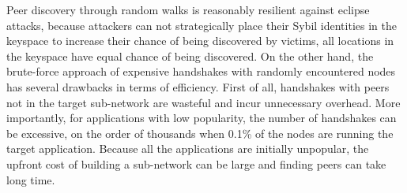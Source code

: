 Peer discovery through random walks is reasonably resilient against eclipse attacks, because attackers can not strategically place their Sybil identities in the keyspace to increase their chance of being discovered by victims, \ie all locations in the keyspace have equal chance of being discovered.
On the other hand, the brute-force approach of expensive handshakes with randomly encountered nodes has several drawbacks in terms of efficiency. First of all, handshakes with peers not in the target sub-network are wasteful and incur unnecessary overhead. %
More importantly, for applications with low popularity, the number of handshakes can be excessive, \ie on the order of thousands when 0.1\% of the nodes are running the target application. Because all the applications are initially unpopular, the upfront cost of building a sub-network can be large and finding peers can take long time.







